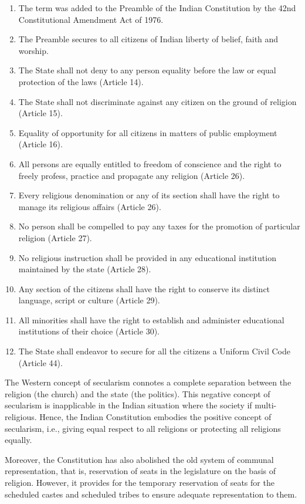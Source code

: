 \renewcommand{\labelenumi}{\textbf{(\alph{enumi})}}
\begin{enumerate}
  \item The term  was added to the Preamble of the Indian Constitution by the 42nd Constitutional Amendment Act of 1976.
  \item The Preamble secures to all citizens of Indian liberty of belief, faith and worship.
  \item The State shall not deny to any person equality before the law or equal protection of the laws (Article 14).
  \item The State shall not discriminate against any citizen on the ground of religion (Article 15).
  \item Equality of opportunity for all citizens in matters of public employment (Article 16).
  \item All persons are equally entitled to freedom of conscience and the right to freely profess, practice and propagate any religion (Article 26).
  \item Every religious denomination or any of its section shall have the right to manage its religious affairs (Article 26).
  \item No person shall be compelled to pay any taxes for the promotion of particular religion (Article 27).
  \item No religious instruction shall be provided in any educational institution maintained by the state (Article 28).
  \item Any section of the citizens shall have the right to conserve its distinct language, script or culture (Article 29).
  \item All minorities shall have the right to establish and administer educational institutions of their choice (Article 30).
  \item The State shall endeavor to secure for all the citizens a Uniform Civil Code (Article 44).
\end{enumerate}

The Western concept of secularism connotes a complete separation between the religion (the church) and the state (the politics). This negative concept of secularism is inapplicable in the Indian situation where the society if multi-religious. Hence, the Indian Constitution embodies the positive concept of secularism, i.e., giving equal respect to all religions or protecting all religions equally.

Moreover, the Constitution has also abolished the old system of communal representation, that is, reservation of seats in the legislature on the basis of religion. However, it provides for the temporary reservation of seats for the scheduled castes and scheduled tribes to ensure adequate representation to them.

